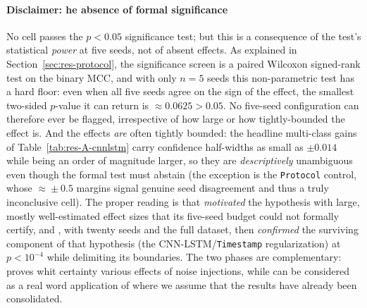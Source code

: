 \documentclass[../main.tex]{subfiles}
\begin{document}
\paragraph{Disclaimer: he absence of formal significance}
No  cell passes the $p < 0.05$ significance test; but this is a consequence of the test's statistical \emph{power} at five seeds, not of absent effects. As explained in Section~\ref{sec:res-protocol}, the significance screen is a paired Wilcoxon signed-rank test on the binary MCC, and with only $n = 5$ seeds this non-parametric test has a hard floor: even when all five seeds agree on the sign of the effect, the smallest two-sided $p$-value it can return is $\approx 0.0625 > 0.05$. No five-seed configuration can therefore ever be flagged, irrespective of how large or how tightly-bounded the effect is. And the effects \emph{are} often tightly bounded: the headline multi-class gains of Table~\ref{tab:res-A-cnnlstm} carry confidence half-widths as small as $\pm 0.014$ while being an order of magnitude larger, so they are \emph{descriptively} unambiguous even though the formal test must abstain (the exception is the \texttt{Protocol} control, whose $\approx\!\pm 0.5$ margins signal genuine seed disagreement and thus a truly inconclusive cell). The proper reading is that  \emph{motivated} the hypothesis with large, mostly well-estimated effect sizes that its five-seed budget could not formally certify, and , with twenty seeds and the full dataset, then \emph{confirmed} the surviving component of that hypothesis (the CNN-LSTM/\texttt{Timestamp} regularization) at $p < 10^{-4}$ while delimiting its boundaries. The two phases are complementary:  proves whit certainty various effects of noise injections, while  can be considered as a real word application of  where we assume that the results have already been consolidated.
\end{document}
